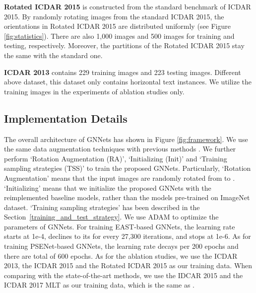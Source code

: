\documentclass[10pt,twocolumn,letterpaper]{article}
\begin{document}
\textbf{Rotated ICDAR 2015} is constructed from the standard benchmark of ICDAR 2015. By randomly rotating images from the standard ICDAR 2015, the orientations in Rotated ICDAR 2015 are distributed uniformly (see Figure \ref{fig:statistics}). There are also 1,000 images and 500 images for training and testing, respectively. Moreover, the partitions of the Rotated ICDAR 2015 stay the same with the standard one.


\textbf{ICDAR 2013} contains 229 training images and 223 testing images. Different above dataset, this dataset only contains horizontal text instances. We  utilize the training images in the experiments of ablation studies only.


\subsection{Implementation Details}\label{Sec:Implementation}
The overall architecture of GNNets has shown in Figure \ref{fig:framework}. We use the same data augmentation techniques with previous methods \cite{Zhou2017, li2018shape}.
We further perform `Rotation Augmentation (RA)', `Initializing (Init)' and `Training sampling strategies (TSS)' to train the proposed GNNets. Particularly, `Rotation Augmentation' means that the input images are randomly rotated from  to . `Initializing' means that we initialize the proposed GNNets with the reimplemented baseline models, rather than the models pre-trained on ImageNet dataset. `Training sampling strategies'  has been described in the Section~\ref{training_and_test_strategy}. We use ADAM \cite{kingma2014adam} to optimize the parameters of GNNets. For training EAST-based GNNets, the learning rate starts at 1e-4, declines to its  for every 27,300 iterations, and stops at 1e-6. As for training PSENet-based GNNets, the learning rate decays per 200 epochs and there are total of 600 epochs. As for the ablation studies, we use the ICDAR 2013, the ICDAR 2015 and the Rotated ICDAR 2015 as our training data. When comparing with the state-of-the-art methods, we use the IDCAR 2015 and the ICDAR 2017 MLT as our training data, which is the same as \cite{li2018shape}.
\end{document}
